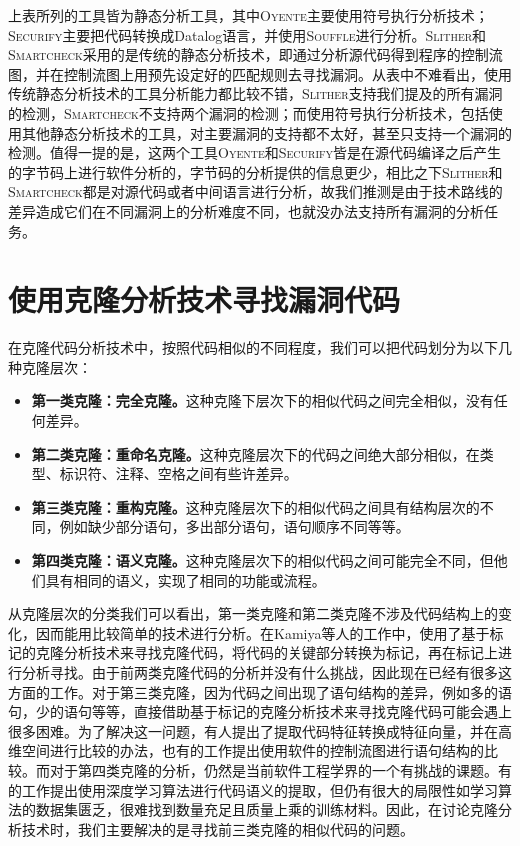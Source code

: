 上表所列的工具皆为静态分析工具，其中\textsc{Oyente}主要使用符号执行分析技术；\textsc{Securify}主要把代码转换成Datalog语言，并使用\textsc{Souffle}进行分析。\textsc{Slither}和\textsc{Smartcheck}采用的是传统的静态分析技术，即通过分析源代码得到程序的控制流图，并在控制流图上用预先设定好的匹配规则去寻找漏洞。从表中不难看出，使用传统静态分析技术的工具分析能力都比较不错，\textsc{Slither}支持我们提及的所有漏洞的检测，\textsc{Smartcheck}不支持两个漏洞的检测；而使用符号执行分析技术，包括使用其他静态分析技术的工具，对主要漏洞的支持都不太好，甚至只支持一个漏洞的检测。值得一提的是，这两个工具\textsc{Oyente}和\textsc{Securify}皆是在源代码编译之后产生的字节码上进行软件分析的，字节码的分析提供的信息更少，相比之下\textsc{Slither}和\textsc{Smartcheck}都是对源代码或者中间语言进行分析，故我们推测是由于技术路线的差异造成它们在不同漏洞上的分析难度不同，也就没办法支持所有漏洞的分析任务。

\section{使用克隆分析技术寻找漏洞代码}

在克隆代码分析技术中，按照代码相似的不同程度，我们可以把代码划分为以下几种克隆层次：
\begin{itemize}
  \item \textbf{第一类克隆：完全克隆。}这种克隆下层次下的相似代码之间完全相似，没有任何差异。
  \item \textbf{第二类克隆：重命名克隆。}这种克隆层次下的代码之间绝大部分相似，在类型、标识符、注释、空格之间有些许差异。
  \item \textbf{第三类克隆：重构克隆。}这种克隆层次下的相似代码之间具有结构层次的不同，例如缺少部分语句，多出部分语句，语句顺序不同等等。
  \item \textbf{第四类克隆：语义克隆。}这种克隆层次下的相似代码之间可能完全不同，但他们具有相同的语义，实现了相同的功能或流程。
\end{itemize}
从克隆层次的分类我们可以看出，第一类克隆和第二类克隆不涉及代码结构上的变化，因而能用比较简单的技术进行分析。在Kamiya等人的工作中\cite{ccfinder}，使用了基于标记的克隆分析技术来寻找克隆代码，将代码的关键部分转换为标记，再在标记上进行分析寻找。由于前两类克隆代码的分析并没有什么挑战，因此现在已经有很多这方面的工作。对于第三类克隆，因为代码之间出现了语句结构的差异，例如多的语句，少的语句等等，直接借助基于标记的克隆分析技术来寻找克隆代码可能会遇上很多困难。为了解决这一问题，有人提出了提取代码特征转换成特征向量，并在高维空间进行比较的办法\cite{deckard}，也有的工作提出使用软件的控制流图进行语句结构的比较\cite{cfgcompare}。而对于第四类克隆的分析，仍然是当前软件工程学界的一个有挑战的课题。有的工作提出使用深度学习算法进行代码语义的提取\cite{bugsjs}，但仍有很大的局限性如学习算法的数据集匮乏，很难找到数量充足且质量上乘的训练材料。因此，在讨论克隆分析技术时，我们主要解决的是寻找前三类克隆的相似代码的问题。

